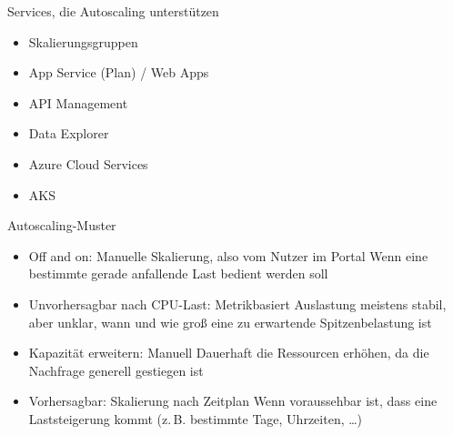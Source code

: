 
\begin{flashcard}[Definition]{Services, die Autoscaling unterstützen}
    \begin{itemize}
        \item Skalierungsgruppen
        \item App Service (Plan) / Web Apps
        \item API Management
        \item Data Explorer
        \item Azure Cloud Services
        \item AKS
    \end{itemize}
\end{flashcard}

\begin{flashcard}[Definition]{Autoscaling-Muster}
    \begin{itemize}
        \item Off and on: Manuelle Skalierung, also vom Nutzer im Portal\newline
            Wenn eine bestimmte gerade anfallende Last bedient werden soll
        \item Unvorhersagbar nach CPU-Last: Metrikbasiert\newline
            Auslastung meistens stabil, aber unklar, wann und wie groß eine zu erwartende Spitzenbelastung ist
        \item Kapazität erweitern: Manuell\newline
            Dauerhaft die Ressourcen erhöhen, da die Nachfrage generell gestiegen ist
        \item Vorhersagbar: Skalierung nach Zeitplan\newline
            Wenn voraussehbar ist, dass eine Laststeigerung kommt (z.\,B. bestimmte Tage, Uhrzeiten, \ldots)
    \end{itemize}
\end{flashcard}
